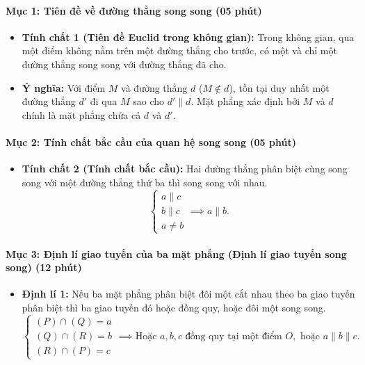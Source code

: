 \documentclass[12pt, a4paper]{article}
\begin{document}
\paragraph{Mục 1: Tiên đề về đường thẳng song song (05 phút)}
\begin{itemize}
    \item \textbf{Tính chất 1 (Tiên đề Euclid trong không gian):} Trong không gian, qua một điểm không nằm trên một đường thẳng cho trước, có một và chỉ một đường thẳng song song với đường thẳng đã cho.
    \item \textbf{Ý nghĩa:} Với điểm $M$ và đường thẳng $d$ ($M \notin d$), tồn tại duy nhất một đường thẳng $d'$ đi qua $M$ sao cho $d' \parallel d$. Mặt phẳng xác định bởi $M$ và $d$ chính là mặt phẳng chứa cả $d$ và $d'$.
\end{itemize}

\paragraph{Mục 2: Tính chất bắc cầu của quan hệ song song (05 phút)}
\begin{itemize}
    \item \textbf{Tính chất 2 (Tính chất bắc cầu):} Hai đường thẳng phân biệt cùng song song với một đường thẳng thứ ba thì song song với nhau.
    $$\begin{cases} a \parallel c \\ b \parallel c \\ a \neq b \end{cases} \implies a \parallel b.$$
\end{itemize}

\paragraph{Mục 3: Định lí giao tuyến của ba mặt phẳng (Định lí giao tuyến song song) (12 phút)}
\begin{itemize}
    \item \textbf{Định lí 1:} Nếu ba mặt phẳng phân biệt đôi một cắt nhau theo ba giao tuyến phân biệt thì ba giao tuyến đó hoặc đồng quy, hoặc đôi một song song.
    $$\begin{cases} (P) \cap (Q) = a \\ (Q) \cap (R) = b \\ (R) \cap (P) = c \end{cases} \implies \text{Hoặc } a, b, c \text{ đồng quy tại một điểm } O, \text{ hoặc } a \parallel b \parallel c.$$
\end{itemize}
\end{document}
